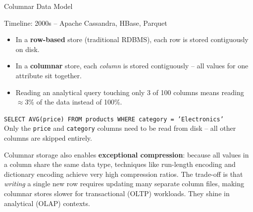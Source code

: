 \begin{frame}{Columnar Data Model}
  \begin{block}{Timeline: 2000s -- Apache Cassandra, HBase, Parquet}
    \begin{itemize}
      \item In a \textbf{row-based} store (traditional RDBMS), each row is
            stored contiguously on disk.
      \item In a \textbf{columnar} store, each \emph{column} is stored
            contiguously -- all values for one attribute sit together.
      \item Reading an analytical query touching only 3 of 100 columns means
            reading $\approx$3\% of the data instead of 100\%.
    \end{itemize}
  \end{block}

  \begin{examples}{}
    \texttt{SELECT AVG(price) FROM products WHERE category = 'Electronics'} \\
    Only the \texttt{price} and \texttt{category} columns need to be read from
    disk -- all other columns are skipped entirely.
  \end{examples}

  Columnar storage also enables \textbf{exceptional compression}: because all
  values in a column share the same data type, techniques like run-length
  encoding and dictionary encoding achieve very high compression ratios.
  The trade-off is that \emph{writing} a single new row requires updating
  many separate column files, making columnar stores slower for
  transactional (OLTP) workloads.  They shine in analytical (OLAP) contexts.
\end{frame}

